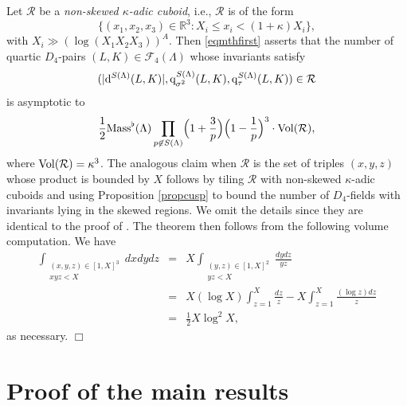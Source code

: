 \documentclass[10pt]{article}
\theoremstyle{plain}
\theoremstyle{definition}
\theoremstyle{remark}
\def\Mass{{\rm Mass}}
\def\Vol{{\rm Vol}}
\def\R{{\mathbb R}}
\def\FF{{\mathcal F}}
\def\RR{{\mathcal R}}
\newcommand{\D}{{\rm d}}
\newcommand{\q}{{\rm q}}
\begin{document}
Let $\RR$ be a {\it non-skewed $\kappa$-adic cuboid}, i.e., $\RR$ is
of the form
\begin{equation*}
\bigl\{(x_1,x_2,x_3)\in\R^3: X_i\leq x_i<(1+\kappa)X_i\bigr\},
\end{equation*}
with $X_i\gg (\log (X_1X_2X_3))^A$. Then \eqref{eqmthfirst} asserts
that the number of quartic $D_4$-pairs $(L,K)\in\FF_4(\Lambda)$ whose
invariants satisfy
\begin{equation*}
(|\D^{S(\Lambda)}(L,K)|,\q_{\sigma^2}^{S(\Lambda)}(L,K),\q_\tau^{S(\Lambda)}(L,K))\in\RR
\end{equation*}
is asymptotic to
\begin{equation*}
\frac12 \Mass^\flat(\Lambda)\prod_{p\not\in S(\Lambda)}
\Bigl(1+\frac{3}{p}\Bigr)
\Bigl(1-\frac{1}{p}  \Bigr)^3
\cdot\Vol(\RR),
\end{equation*}
where $\Vol(\RR) = \kappa^3$.
The analogous claim when $\RR$ is the set of triples $(x,y,z)$ whose
product is bounded by $X$ follows by tiling $\RR$ with non-skewed
$\kappa$-adic cuboids and using Proposition \ref{propcusp} to bound
the number of $D_4$-fields with invariants lying in the skewed
regions. We omit the details since they are identical to the proof of
\cite[Theorem 6]{D4preprint}. The theorem then follows from the following
volume computation. We have
\begin{equation*}
\begin{array}{rcl}
\displaystyle\int_{\substack{(x,y,z)\in[1,X]^3\\xyz<X}}dxdydz
&=&\displaystyle X\int_{\substack{(y,z)\in[1,X]^2\\yz<X}}\frac{dydz}{yz}
\\[.2in]&=&\displaystyle
X(\log X)\int_{z=1}^X\frac{dz}{z}-X\int_{z=1}^X\frac{(\log z)dz}{z}
\\[.2in]&=&\displaystyle
\frac{1}{2}X\log^2 X,
\end{array}
\end{equation*}
as necessary. \hfill $\Box$








\section{Proof of the main results}
\end{document}
